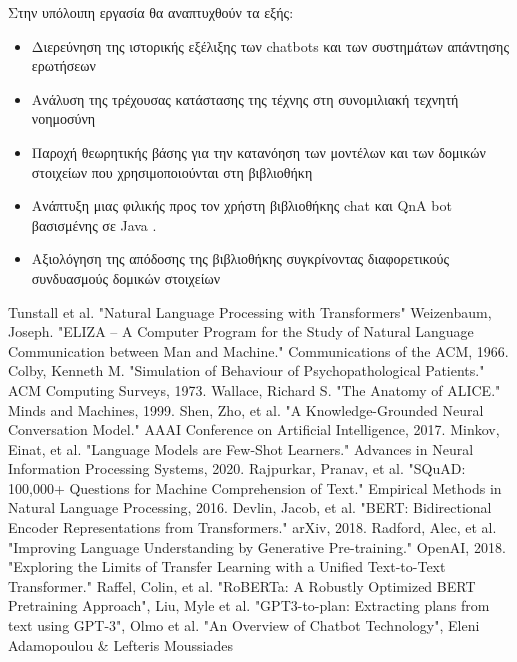 \documentclass{report}
\begin{document}
Στην υπόλοιπη εργασία θα αναπτυχθούν τα εξής:

\begin{itemize}
  \item Διερεύνηση της ιστορικής εξέλιξης των chatbots και των συστημάτων απάντησης ερωτήσεων
  \item Ανάλυση της τρέχουσας κατάστασης της τέχνης στη συνομιλιακή τεχνητή νοημοσύνη 
  \item Παροχή θεωρητικής βάσης για την κατανόηση των μοντέλων και των δομικών στοιχείων που χρησιμοποιούνται στη βιβλιοθήκη
  \item Ανάπτυξη μιας φιλικής προς τον χρήστη βιβλιοθήκης chat και QnA bot βασισμένης σε Java .
  \item Αξιολόγηση της απόδοσης της βιβλιοθήκης συγκρίνοντας διαφορετικούς συνδυασμούς δομικών στοιχείων
\end{itemize}

\begin{thebibliography}{10}
 Tunstall et al. "Natural Language Processing with Transformers"
 Weizenbaum, Joseph. "ELIZA – A Computer Program for the Study of Natural Language Communication between Man and Machine." Communications of the ACM, 1966.
 Colby, Kenneth M. "Simulation of Behaviour of Psychopathological Patients." ACM Computing Surveys, 1973.
 Wallace, Richard S. "The Anatomy of ALICE." Minds and Machines, 1999.
 Shen, Zho, et al. "A Knowledge-Grounded Neural Conversation Model." AAAI Conference on Artificial Intelligence, 2017.
 Minkov, Einat, et al. "Language Models are Few-Shot Learners." Advances in Neural Information Processing Systems, 2020.
 Rajpurkar, Pranav, et al. "SQuAD: 100,000+ Questions for Machine Comprehension of Text." Empirical Methods in Natural Language Processing, 2016.
 Devlin, Jacob, et al. "BERT: Bidirectional Encoder Representations from Transformers." arXiv, 2018.
 Radford, Alec, et al. "Improving Language Understanding by Generative Pre-training." OpenAI, 2018.
 "Exploring the Limits of Transfer Learning with a Unified Text-to-Text Transformer." Raffel, Colin, et al. 
 "RoBERTa: A Robustly Optimized BERT Pretraining Approach", Liu, Myle et al. 
 "GPT3-to-plan: Extracting plans from text using GPT-3", Olmo et al. 
 "An Overview of Chatbot Technology", Eleni Adamopoulou \& Lefteris Moussiades 

\end{thebibliography}
\end{document}
